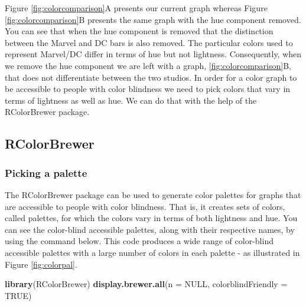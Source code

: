 \documentclass[
]{krantz}
\makeatletter
\newenvironment{Shaded}{\begin{snugshade}}{\end{snugshade}}
\newcommand{\DataTypeTok}[1]{\textcolor[rgb]{0.27,0.27,0.27}{#1}}
\newcommand{\KeywordTok}[1]{\textcolor[rgb]{0.27,0.27,0.27}{\textbf{#1}}}
\newcommand{\NormalTok}[1]{#1}
\newcommand{\OtherTok}[1]{\textcolor[rgb]{0.37,0.37,0.37}{#1}}
\newenvironment{kframe}{%
\medskip{}
\setlength{\fboxsep}{.8em}
 \def\at@end@of@kframe{}%
 \ifinner\ifhmode%
  \def\at@end@of@kframe{\end{minipage}}%
  \begin{minipage}{\columnwidth}%
 \fi\fi%
 \def\FrameCommand##1{\hskip\@totalleftmargin \hskip-\fboxsep
 \colorbox{shadecolor}{##1}\hskip-\fboxsep
     \hskip-\linewidth \hskip-\@totalleftmargin \hskip\columnwidth}%
 \MakeFramed {\advance\hsize-\width
   \@totalleftmargin\z@ \linewidth\hsize
   \@setminipage}}%
 {\par\unskip\endMakeFramed%
 \at@end@of@kframe}
\renewenvironment{Shaded}{\begin{kframe}}{\end{kframe}}
\makeatother
\begin{document}
Figure \ref{fig:colorcomparison}A presents our current graph whereas Figure \ref{fig:colorcomparison}B presents the same graph with the hue component removed. You can see that when the hue component is removed that the distinction between the Marvel and DC bars is also removed. The particular colors used to represent Marvel/DC differ in terms of hue but not lightness. Consequently, when we remove the hue component we are left with a graph, \ref{fig:colorcomparison}B, that does not differentiate between the two studios. In order for a color graph to be accessible to people with color blindness we need to pick colors that vary in terms of lightness as well as hue. We can do that with the help of the RColorBrewer package.

\hypertarget{rcolorbrewer}{%
\subsection{RColorBrewer}\label{rcolorbrewer}}

\hypertarget{picking-a-palette}{%
\subsubsection{Picking a palette}\label{picking-a-palette}}

The RColorBrewer package can be used to generate color palettes for graphs that are accessible to people with color blindness. That is, it creates sets of colors, called palettes, for which the colors vary in terms of both lightness and hue. You can see the color-blind accessible palettes, along with their respective names, by using the command below. This code produces a wide range of color-blind accessible palettes with a large number of colors in each palette - as illustrated in Figure \ref{fig:colorpal}.

\begin{Shaded}
\begin{Highlighting}[]
\KeywordTok{library}\NormalTok{(RColorBrewer)}
\KeywordTok{display.brewer.all}\NormalTok{(}\DataTypeTok{n =} \OtherTok{NULL}\NormalTok{, }\DataTypeTok{colorblindFriendly =} \OtherTok{TRUE}\NormalTok{)}
\end{Highlighting}
\end{Shaded}
\end{document}
